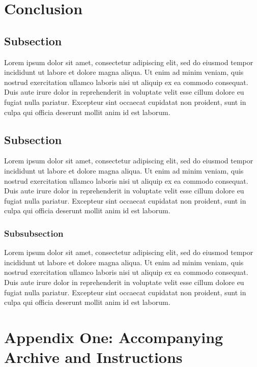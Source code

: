 \documentclass[twoside,11pt,a4paper]{article}
\begin{document}
\clearpage
\section{Conclusion}
\subsection{Subsection}
Lorem ipsum dolor sit amet, consectetur adipiscing elit, sed do eiusmod tempor incididunt ut labore et dolore magna aliqua. Ut enim ad minim veniam, quis nostrud exercitation ullamco laboris nisi ut aliquip ex ea commodo consequat. Duis aute irure dolor in reprehenderit in voluptate velit esse cillum dolore eu fugiat nulla pariatur. Excepteur sint occaecat cupidatat non proident, sunt in culpa qui officia deserunt mollit anim id est laborum.

\subsection{Subsection}
Lorem ipsum dolor sit amet, consectetur adipiscing elit, sed do eiusmod tempor incididunt ut labore et dolore magna aliqua. Ut enim ad minim veniam, quis nostrud exercitation ullamco laboris nisi ut aliquip ex ea commodo consequat. Duis aute irure dolor in reprehenderit in voluptate velit esse cillum dolore eu fugiat nulla pariatur. Excepteur sint occaecat cupidatat non proident, sunt in culpa qui officia deserunt mollit anim id est laborum.

\subsubsection{Subsubsection}
Lorem ipsum dolor sit amet, consectetur adipiscing elit, sed do eiusmod tempor incididunt ut labore et dolore magna aliqua. Ut enim ad minim veniam, quis nostrud exercitation ullamco laboris nisi ut aliquip ex ea commodo consequat. Duis aute irure dolor in reprehenderit in voluptate velit esse cillum dolore eu fugiat nulla pariatur. Excepteur sint occaecat cupidatat non proident, sunt in culpa qui officia deserunt mollit anim id est laborum.

\clearpage
\lhead{}\rhead{}
{}



\clearpage
\section{Appendix One: Accompanying Archive and Instructions}
\label{section:appendix}
\end{document}
